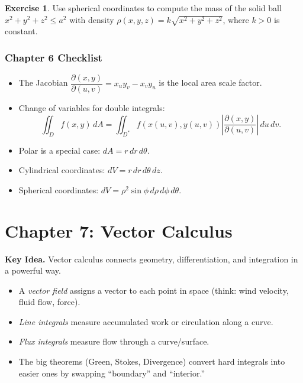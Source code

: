 \documentclass[12pt]{article}
\numberwithin{equation}{section}
\theoremstyle{plain}
\theoremstyle{definition}
\newtheorem{exercise}[theorem]{Exercise}
\theoremstyle{remark}
\newenvironment{keyidea}{\begin{tcolorbox}\textbf{Key Idea.}}{\end{tcolorbox}}
\begin{document}
\begin{exercise}
Use spherical coordinates to compute the mass of the solid ball $x^2+y^2+z^2\le a^2$ with density $\rho(x,y,z)=k\sqrt{x^2+y^2+z^2}$, where $k>0$ is constant.
\end{exercise}

\subsubsection*{Chapter 6 Checklist}
\begin{itemize}
\item The Jacobian $\dfrac{\partial(x,y)}{\partial(u,v)}=x_u y_v-x_v y_u$ is the local area scale factor.
\item Change of variables for double integrals:
\[
\iint_D f(x,y)\,dA=\iint_{D^\ast} f(x(u,v),y(u,v))\left|\frac{\partial(x,y)}{\partial(u,v)}\right|\,du\,dv.
\]
\item Polar is a special case: $dA=r\,dr\,d\theta$.
\item Cylindrical coordinates: $dV=r\,dr\,d\theta\,dz$.
\item Spherical coordinates: $dV=\rho^2\sin\phi\,d\rho\,d\phi\,d\theta$.
\end{itemize}



\section{Chapter 7: Vector Calculus}

\begin{keyidea}
Vector calculus connects geometry, differentiation, and integration in a powerful way.

\begin{itemize}
\item A \emph{vector field} assigns a vector to each point in space (think: wind velocity, fluid flow, force).
\item \emph{Line integrals} measure accumulated work or circulation along a curve.
\item \emph{Flux integrals} measure flow through a curve/surface.
\item The big theorems (Green, Stokes, Divergence) convert hard integrals into easier ones by swapping “boundary” and “interior.”
\end{itemize}
\end{keyidea}
\end{document}
